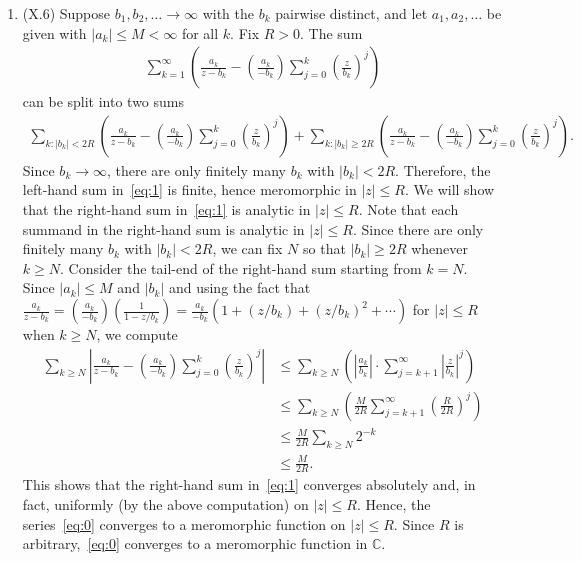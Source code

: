 \documentclass[11pt]{book}
\theoremstyle{definition}
\begin{document}
\begin{enumerate}
	

	

  \item (X.6) Suppose $b_1,b_2,\ldots  \to \infty$ with the $b_k$ pairwise distinct, and let $a_1,a_2,\ldots$ be given with $|a_k| \leq M < \infty$ for all $k$.  Fix $R>0$. The sum  
    \begin{align} \sum_{k=1}^\infty \left( \frac{a_k}{z-b_k} - \left( \frac{a_k}{-b_k} \right) \sum_{j=0}^k \left( \frac{z}{b_k} \right)^j \right) \label{eq:0} \end{align}
    can be split into two sums
    \begin{align} \sum_{k : |b_k| < 2R} \left( \frac{a_k}{z-b_k} - \left( \frac{a_k}{-b_k} \right) \sum_{j=0}^k \left( \frac{z}{b_k} \right)^j \right)  + \sum_{k : |b_k| \geq 2R} \left( \frac{a_k}{z-b_k} - \left( \frac{a_k}{-b_k} \right) \sum_{j=0}^k \left( \frac{z}{b_k} \right)^j \right) . \label{eq:1} \end{align} 
      Since $b_k \to \infty$, there are only finitely many $b_k$ with $|b_k| < 2R$.  Therefore, the left-hand sum in~\eqref{eq:1} is finite, hence meromorphic in $|z|\leq R$.  We will show that the right-hand sum in~\eqref{eq:1} is analytic in $|z|\leq R$.  Note that each summand in the right-hand sum is analytic in $|z|\leq R$.  Since there are only finitely many $b_k$ with $|b_k| < 2R$, we can fix $N$ so that $|b_k| \geq 2R$ whenever $k\geq N$.   Consider the tail-end of the right-hand sum starting from $k=N$.  Since $|a_k| \leq M$ and $|b_k|$ and using the fact that $\frac{a_k}{z-b_k} = \left( \frac{a_k}{-b_k} \right) \left( \frac{1}{1-z/b_k} \right) = \frac{a_k}{-b_k} (1 + (z/b_k) + (z/b_k)^2 + \cdots)$ for $|z| \leq R$ when $k\geq N$, we compute
    \begin{align*}
      \sum_{k\geq N}  \left| \frac{a_k}{z-b_k} - \left( \frac{a_k}{-b_k} \right) \sum_{j=0}^k \left( \frac{z}{b_k} \right)^j \right|  &\leq \sum_{k\geq N}  \left( \left| \frac{a_k}{b_k} \right| \cdot  \sum_{j=k+1}^\infty \left| \frac{z}{b_k} \right|^j \right) \\
      &\leq \sum_{k\geq N}\left( \frac{M}{2R} \sum_{j=k+1}^\infty \left( \frac{R}{2R} \right)^j \right) \\
      &\leq \frac{M}{2R} \sum_{k\geq N} 2^{-k}  \\
      &\leq \frac{M}{2R}. 
    \end{align*}
    This shows that the right-hand sum in~\eqref{eq:1} converges absolutely and, in fact, uniformly (by the above computation) on $|z| \leq R$.  Hence, the series~\eqref{eq:0} converges to a meromorphic function on $|z|\leq R$.  Since $R$ is arbitrary,~\eqref{eq:0} converges to a meromorphic function in $\mathbb C$. 


\end{enumerate}
\end{document}
